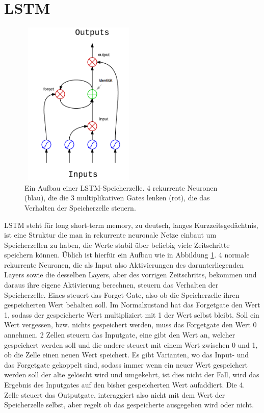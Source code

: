 \section{LSTM}
\begin{figure}
	\centering
	\includegraphics[width=0.5\textwidth, height=300px]{pics/lstm.png}	
	\caption{Ein Aufbau einer LSTM-Speicherzelle. 4 rekurrente Neuronen (blau), die die 3 multiplikativen Gates lenken (rot), die das Verhalten der Speicherzelle steuern.    \cite{bib:lstm}}
	\label{img:lstm}
\end{figure}
LSTM steht für long short-term memory, zu deutsch, langes Kurzzeitsgedächtnis, ist eine Struktur die man in rekurrente neuronale Netze einbaut um Speicherzellen zu haben, die Werte stabil über beliebig viele Zeitschritte speichern können. Üblich ist hierfür ein Aufbau wie in Abbildung \ref{img:lstm}. 4 normale rekurrente Neuronen, die als Input also Aktivierungen des darunterliegenden Layers sowie die desselben Layers, aber des vorrigen Zeitschritts, bekommen und daraus ihre eigene Aktivierung berechnen, steuern das Verhalten der Speicherzelle. Eines steuert das Forget-Gate, also ob die Speicherzelle ihren gespeicherten Wert behalten soll. Im Normalzustand hat das Forgetgate den Wert 1, sodass der gespeicherte Wert multipliziert mit 1 der Wert selbst bleibt. Soll ein Wert vergessen, bzw. nichts gespeichert werden, muss das Forgetgate den Wert 0 annehmen. 2 Zellen steuern das Inputgate, eine gibt den Wert an, welcher gespeichert werden soll und die andere steuert mit einem Wert zwischen 0 und 1, ob die Zelle einen neuen Wert speichert. Es gibt Varianten, wo das Input- und das Forgetgate gekoppelt sind, sodass immer wenn ein neuer Wert gespeichert werden soll der alte gelöscht wird und umgekehrt, ist dies nicht der Fall, wird das Ergebnis des Inputgates auf den bisher gespeicherten Wert aufaddiert. Die 4. Zelle steuert das Outputgate, interaggiert also nicht mit dem Wert der Speicherzelle selbst, aber regelt ob das gespeicherte ausgegeben wird oder nicht. \cite{bib:lstm2}

